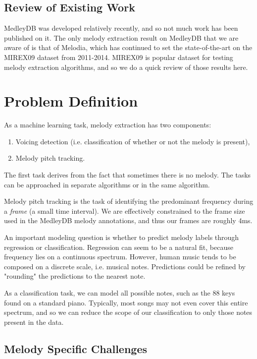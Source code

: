 \documentclass{article} %
\begin{document}
\subsection{Review of Existing Work}

MedleyDB was developed relatively recently, and so not much work has been published on it.  The only melody extraction result on MedleyDB that we are aware of is that of Melodia, which has continued to set the state-of-the-art on the MIREX09 dataset from 2011-2014.  MIREX09 is popular dataset for testing melody extraction algorithms, and so we do a quick review of those results here.

\section{Problem Definition}
As a machine learning task, melody extraction has two components:

\begin{enumerate}
\item Voicing detection (i.e. classification of whether or not the melody is present),
\item Melody pitch tracking.
\end{enumerate}

The first task derives from the fact that sometimes there is no melody.  The tasks can be approached in separate algorithms or in the same algorithm.

Melody pitch tracking is the task of identifying the predominant frequency during a \textit{frame} (a small time interval).  We are effectively constrained to the frame size used in the MedleyDB melody annotations, and thus our frames are roughly 4ms.

An important modeling question is whether to predict melody labels through regression or classification.  Regression can seem to be a natural fit, because frequency lies on a continuous spectrum.  However, human music tends to be composed on a discrete scale, i.e. musical notes.  Predictions could be refined by "rounding" the predictions to the nearest note.

As a classification task, we can model all possible notes, such as the 88 keys found on a standard piano.  Typically, most songs may not even cover this entire spectrum, and so we can reduce the scope of our classification to only those notes present in the data.

\subsection{Melody Specific Challenges}
\end{document}
